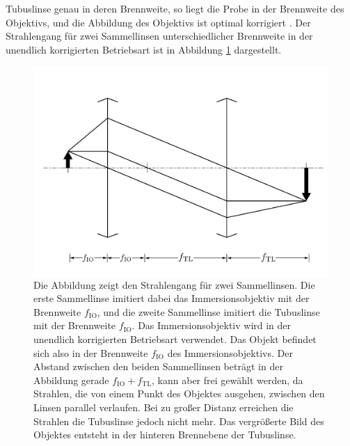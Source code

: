 \documentclass[a4paper, titlepage,  ngerman]{book}
\begin{document}
Tubuslinse genau in deren Brennweite, so liegt die Probe in der Brennweite des Objektivs, und die Abbildung des Objektivs ist optimal korrigiert \cite{Kuhl.2018}. Der Strahlengang für zwei Sammellinsen unterschiedlicher Brennweite in der unendlich korrigierten Betriebsart ist in Abbildung \ref{fig:bildentstehungobjektiv} dargestellt.
	\begin{figure}
		\centering
		\includegraphics[width=0.7\linewidth]{figures/BildentstehungObjektiv.pdf}
		\caption[Strahlengang eines unendlich korrigierten Objektivs]{Die Abbildung zeigt den Strahlengang für zwei Sammellinsen. Die erste Sammellinse imitiert dabei das Immersionsobjektiv mit der Brennweite $f_\mathrm{IO}$, und die zweite Sammellinse imitiert die Tubuslinse mit der Brennweite $f_\mathrm{IO}$. Das Immersionsobjektiv wird in der unendlich korrigierten Betriebsart verwendet. Das Objekt befindet sich also in der Brennweite $f_\mathrm{IO}$ des Immersionsobjektivs. Der Abstand zwischen den beiden Sammellinsen beträgt in der Abbildung gerade $f_\mathrm{IO} + f_\mathrm{TL}$, kann aber frei gewählt werden, da Strahlen, die von einem Punkt des Objektes ausgehen, zwischen den Linsen parallel verlaufen. Bei zu großer Distanz erreichen die Strahlen die Tubuslinse jedoch nicht mehr. Das vergrößerte Bild des Objektes entsteht in der hinteren Brennebene der Tubuslinse.}
		\label{fig:bildentstehungobjektiv}
	\end{figure}
	
\end{document}
